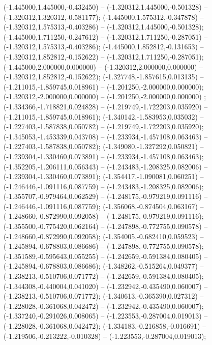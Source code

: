  (-1.445000,1.445000,-0.432450) -- (-1.320312,1.445000,-0.501328) -- (-1.320312,1.320312,-0.581177);
 (-1.445000,1.575312,-0.347878) -- (-1.320312,1.575313,-0.403286) -- (-1.320312,1.445000,-0.501328);
 (-1.445000,1.711250,-0.247612) -- (-1.320312,1.711250,-0.287051) -- (-1.320312,1.575313,-0.403286);
 (-1.445000,1.852812,-0.131653) -- (-1.320312,1.852812,-0.152622) -- (-1.320312,1.711250,-0.287051);
 (-1.445000,2.000000,0.000000) -- (-1.320312,2.000000,0.000000) -- (-1.320312,1.852812,-0.152622);
 (-1.327748,-1.857615,0.013135) -- (-1.211015,-1.859745,0.018961) -- (-1.201250,-2.000000,0.000000);
 (-1.320312,-2.000000,0.000000) -- (-1.201250,-2.000000,0.000000) ;
 (-1.334366,-1.718821,0.024828) -- (-1.219749,-1.722203,0.035920) -- (-1.211015,-1.859745,0.018961);
 (-1.340142,-1.583953,0.035032) -- (-1.227403,-1.587838,0.050782) -- (-1.219749,-1.722203,0.035920);
 (-1.345053,-1.453339,0.043708) -- (-1.233934,-1.457108,0.063463) -- (-1.227403,-1.587838,0.050782);
 (-1.349080,-1.327292,0.050821) -- (-1.239304,-1.330460,0.073891) -- (-1.233934,-1.457108,0.063463);
 (-1.352205,-1.206111,0.056343) -- (-1.243483,-1.208325,0.082006) -- (-1.239304,-1.330460,0.073891);
 (-1.354417,-1.090081,0.060251) -- (-1.246446,-1.091116,0.087759) -- (-1.243483,-1.208325,0.082006);
 (-1.355707,-0.979464,0.062529) -- (-1.248175,-0.979219,0.091116) -- (-1.246446,-1.091116,0.087759);
 (-1.356068,-0.874504,0.063167) -- (-1.248660,-0.872990,0.092058) -- (-1.248175,-0.979219,0.091116);
 (-1.355500,-0.775420,0.062164) -- (-1.247898,-0.772755,0.090578) -- (-1.248660,-0.872990,0.092058);
 (-1.354005,-0.682410,0.059523) -- (-1.245894,-0.678803,0.086686) -- (-1.247898,-0.772755,0.090578);
 (-1.351589,-0.595643,0.055255) -- (-1.242659,-0.591384,0.080405) -- (-1.245894,-0.678803,0.086686);
 (-1.348262,-0.515264,0.049377) -- (-1.238213,-0.510706,0.071772) -- (-1.242659,-0.591384,0.080405);
 (-1.344308,-0.440004,0.041020) -- (-1.232942,-0.435490,0.060007) -- (-1.238213,-0.510706,0.071772);
 (-1.340613,-0.365390,0.027312) -- (-1.228028,-0.361068,0.042472) -- (-1.232942,-0.435490,0.060007);
 (-1.337240,-0.291026,0.008065) -- (-1.223553,-0.287004,0.019013) -- (-1.228028,-0.361068,0.042472);
 (-1.334183,-0.216858,-0.016691) -- (-1.219506,-0.213222,-0.010328) -- (-1.223553,-0.287004,0.019013);
